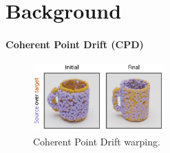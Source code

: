 \documentclass{article}
\begin{document}


\section{Background}
\label{sec:background}

\paragraph{Coherent Point Drift (CPD)}

\begin{figure}
    \centering
    \vspace{-2.5em}
    \includegraphics[width=0.45\textwidth]{figures/warping_small.pdf}
    \caption{Coherent Point Drift warping.}
    \label{fig:warping}
\end{figure}
\end{document}
